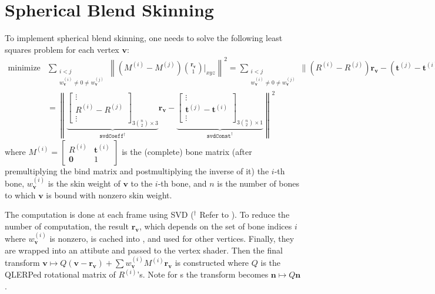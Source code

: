 \documentclass{homework}
\begin{document}
\section{Spherical Blend Skinning}
To implement spherical blend skinning, one needs to solve the following least squares problem for each vertex $\mathbf v$:
\begin{align*}
    \text{minimize} &\sum_{\substack{i < j \\w_\mathbf v^{(i)} \ne 0 \ne w_\mathbf v^{(j)} }} \left\| (M^{(i)} - M^{(j)})\binom{\mathbf r_\mathbf v}{1}\bigg|_{xyz} \right\|^2 =\sum_{\substack{i < j \\w_\mathbf v^{(i)} \ne 0 \ne w_\mathbf v^{(j)} }} \| (R^{(i)} - R^{(j)})\mathbf r_\mathbf v - (\mathbf t^{(j)} - \mathbf t^{(i)}) \|^2 
 \\&= \left\| \underbrace{\begin{bmatrix}\vdots \\R^{(i)} - R^{(j)} \\ \vdots\end{bmatrix}_{3\binom n 2\times 3}}_{\texttt{svdCoeff}^\dagger} \mathbf r_{\mathbf v} - \underbrace{\begin{bmatrix}\vdots \\\mathbf t^{(j)} - \mathbf t^{(i)} \\ \vdots\end{bmatrix}_{3\binom n 2\times 1} }_{\texttt{svdConst}^\dagger}\right\|^2
\end{align*}
where $M^{(i)} = \begin{bmatrix}R^{(i)} & \mathbf t^{(i)}\\ \mathbf 0&1\end{bmatrix}$ is the (complete) bone matrix (after premultiplying the bind matrix and postmultiplying the inverse of it) the $i$-th bone, $w_{\mathbf v}^{(i)}$ is the skin weight of $\mathbf v$ to the $i$-th bone, and $n$ is the number of bones to which $\mathbf v$ is bound with nonzero skin weight.

The computation is done at each frame using SVD ($^\dagger$ Refer to ). To reduce the number of computation, the result $\mathbf r_\mathbf v$, which depends on the set of bone indices $i$ where $w_\mathbf v^{(i)}$ is nonzero, is cached into , and used for other vertices. Finally, they are wrapped into an attibute and passed to the vertex shader. Then the final transform $\mathbf v \mapsto Q(\mathbf v - \mathbf r_\mathbf v) + \sum w_\mathbf v^{(i)}M^{(i)}\mathbf r_\mathbf v$ is constructed where $Q$ is the QLERPed rotational matrix of $R^{(i)}$'s. Note for s the transform becomes $\mathbf n \mapsto Q\mathbf n$.
\end{document}
